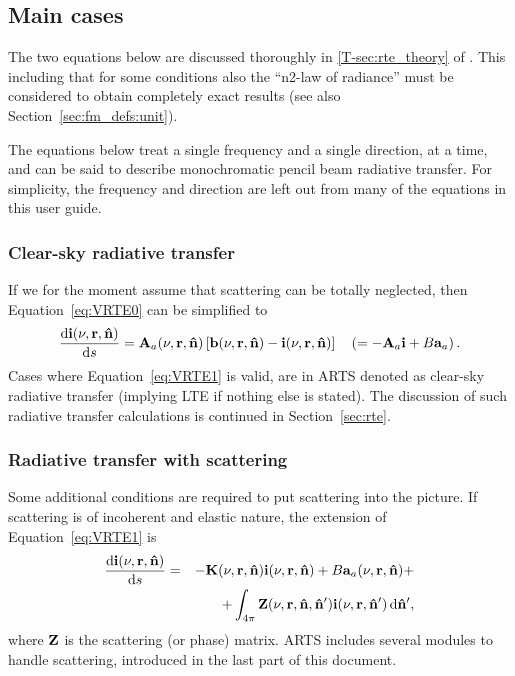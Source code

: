 \subsection{Main cases}
\label{sec:rteq:cases}
%
The two equations below are discussed thoroughly in \ref{T-sec:rte_theory} of
\theory. This including that for some conditions also the ``n2-law of
radiance'' must be considered to obtain completely exact results (see also
Section~\ref{sec:fm_defs:unit}).

The equations below treat a single frequency and a single direction,
at a time, and can be said to describe monochromatic pencil beam radiative
transfer. For simplicity, the frequency and direction are left out from many of
the equations in this user guide.

\subsubsection{Clear-sky radiative transfer}
%
If we for the moment assume that scattering can be totally neglected, then
Equation~\ref{eq:VRTE0} can be simplified to
\begin{equation}
  \label{eq:VRTE1}
  \frac{\mathrm{d}{\bf i}(\nu,{\bf r},{\bf \hat{n}})}{\mathrm{d} s} =
  {\bf A}_{a}(\nu,{\bf r},{\bf \hat{n}})\left[ {\bf b}(\nu,{\bf r},{\bf \hat{n}})- 
  {\bf i}(\nu,{\bf r},{\bf \hat{n}})\right] \quad 
  \left( = -{\bf A}_{a}{\bf i} + B{\bf a}_{a}\right).
\end{equation}
Cases where Equation~\ref{eq:VRTE1} is valid, are in ARTS denoted as clear-sky
radiative transfer (implying LTE if nothing else is stated). The discussion of
such radiative transfer calculations is continued in Section~\ref{sec:rte}.


\subsubsection{Radiative transfer with scattering}
%
Some additional conditions are required to put scattering into the picture. If
scattering is of incoherent and elastic nature, the extension of 
Equation~\ref{eq:VRTE1} is
\begin{eqnarray}
  \label{eq:VRTE2}
  \frac {\mathrm{d}{\bf i}(\nu,{\bf r},{\bf \hat{n}})}{\mathrm{d} s} &=&
    -{\bf K}(\nu,{\bf r},{\bf \hat{n}}) {\bf i}(\nu,{\bf r},{\bf \hat{n}}) +
     B{\bf a}_{a}(\nu,{\bf r},{\bf \hat{n}}) + \\ \nonumber
    &&+ \int_{4\pi} {\bf Z}(\nu,{\bf r},{\bf \hat{n}},{\bf \hat{n}}')
    {\bf i}(\nu,{\bf r},{\bf \hat{n}}')\,\mathrm{d}{\bf \hat{n}}' ,
\end{eqnarray}
where ${\bf Z}$ is the scattering (or phase) matrix.  ARTS includes several
modules to handle scattering, introduced in the last part of this document.\\





